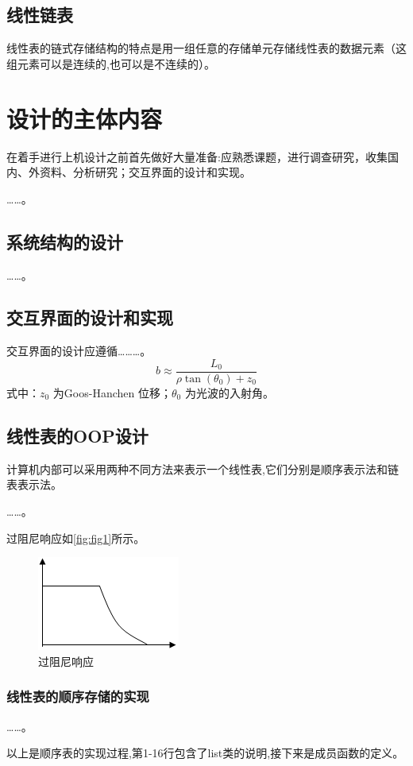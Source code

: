 \documentclass{upcthesis}
\begin{document}
\subsection{线性链表}
	线性表的链式存储结构的特点是用一组任意的存储单元存储线性表的数据元素（这组元素可以是连续的,也可以是不连续的）。\cite{yanDS}

\section{设计的主体内容}
在着手进行上机设计之前首先做好大量准备:应熟悉课题，进行调查研究，收集国内、外资料、分析研究；交互界面的设计和实现。

……。
\subsection{系统结构的设计}
	……。
\subsection{交互界面的设计和实现}
	交互界面的设计应遵循………。
	\begin{equation}
		b \approx \frac{L_0}{\rho\tan(\theta_0) + z_0}
	\end{equation}
式中：$z_0$ 为Goos-Hanchen 位移；$\theta_0$ 为光波的入射角。
\subsection{线性表的OOP设计}
	计算机内部可以采用两种不同方法来表示一个线性表,它们分别是顺序表示法和链表表示法。
	
	……。
	
	过阻尼响应如\autoref{fig:fig1}所示。
	\begin{figure}[htbp]
		\centering
		\includegraphics{./figures/fig1.png}
		\caption{过阻尼响应}
		\label{fig:fig1}
	\end{figure}

\subsubsection{线性表的顺序存储的实现}
……。

以上是顺序表的实现过程,第1-16行包含了list类的说明,接下来是成员函数的定义。\cite{C++OOP}
\end{document}
